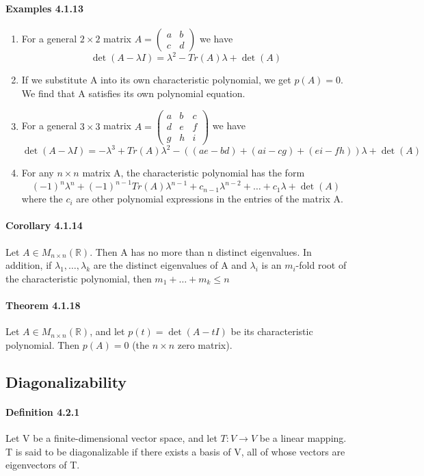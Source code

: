 \documentclass[11pt]{article}
\newcommand{\real}[0]{\mathbb{R}}
\begin{document}
{\paragraph{Examples 4.1.13}
\begin{enumerate}
	\item For a general $2 \times 2$ matrix $A = \begin{pmatrix} a&b\\c&d \end{pmatrix}$ we have $$\det(A - \lambda I) = \lambda^2 - Tr(A)\lambda + \det(A)$$
	\item If we substitute A into its own characteristic polynomial, we get $p(A) = 0$. We find that A satisfies its own polynomial equation.
	\item For a general $3 \times 3$ matrix $A = \begin{pmatrix} a&b&c\\d&e&f\\g&h&i \end{pmatrix}$ we have $$\det(A - \lambda I) = -\lambda^3 + Tr(A)\lambda^2 - ((ae - bd) + (ai - cg) + (ei - fh))\lambda + \det(A)$$
	\item For any $n \times n$ matrix A, the characteristic polynomial has the form $$(-1)^n\lambda^n + (-1)^{n-1}Tr(A)\lambda^{n-1} + c_{n-1}\lambda^{n-2} + \hdots + c_1\lambda + \det(A)$$ where the $c_i$ are other polynomial expressions in the entries of the matrix A.
\end{enumerate} 
\paragraph{Corollary 4.1.14} Let $A \in M_{n\times n}(\real)$. Then A has no more than n distinct eigenvalues. In addition, if $\lambda_1, \hdots, \lambda_k$ are the distinct eigenvalues of A and $\lambda_i$ is an $m_i$-fold root of the characteristic polynomial, then $m_1 + \hdots + m_k \leq n$

\paragraph{Theorem 4.1.18} Let $A \in M_{n \times n}(\real)$, and let $p(t) = \det(A - tI)$ be its characteristic polynomial. Then $p(A) = 0$ (the $n \times n$ zero matrix).
\subsection{Diagonalizability}
\paragraph{Definition 4.2.1} Let V be a finite-dimensional vector space, and let $T: V \rightarrow V$ be a linear mapping. T is said to be diagonalizable if there exists a basis of V, all of whose vectors are eigenvectors of T.
}
\end{document}
